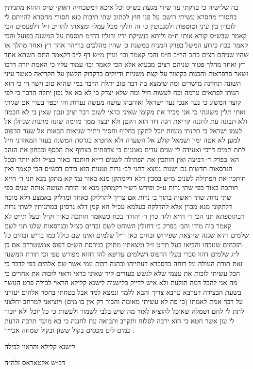 {בה שלישיה כי בדקתי עד שידי מגעת בש״ס וכל איכא דמשכחיה דאוקי ש״ס
ההוא מתניתין בחסורי מחסרא עשיתי רושם על פני חוץ לכתוב שתי תיבות
כזא חסורי מחסרא להיותם לי לזכרון בין עיני וטוטפות ולסנבוטין כי זה חלקי
מכל עמלי\hdot
ומצאתי להר״ב ז״ל דלפעמים הכי קאמר שבש״ס קורא אותו ח״מ וליתא
בנשיקת ידיו ורגליו דח״מ תוספת על המשנה בפועל והכי קאמר בכח כידוע המשל
בפרק המניח במשנת כ׳ שהיו מהלכים בר״הר אחד רץ ואחד מהלך או שהיו שניהם
רצים כתב הר״ב ח״מ והכי קאמר וכו׳ ועיין מ״ש דף ל״ב דקאמר התם השתא אחד
רץ ואחד מהלך פטור שניהם רצים מבעיא אלא הכי קאמר וכו׳ עמוד עליו כי האמת
יורה דרכו\hdot
ושאר פרפראות והבנות בקיצור על קצת משניות ודיוקים בדקדוק
הלשון על הקריאה כאשר עיני השונה תחזינה מישרים ומה שימצא בה דבר טוב יתלה
הדבר במי שהוא טוב וישר ה׳ כי הוא הנותן לפתאים ערמה וכח לעשות חיל ומה
שלא יצדק כי לא בא אל נכון יתלה הדבר בי לפי קוצר המשיג כי נער אנכי נער
ישראל ואוהבהו עושה מעשה נערות\hdot
וה׳ יכפר בעדי אם שגיתי ואתי תלין משוגתי
כי אני מכיר את מקומי שאיני כדאי לשום דבר יציב ונכון שאין בי לא חכמה ולא
תבונה עת לחננה\hdot
קריאת חנה דוד הוא הקטן ולא יבצר ממך מזימה שונה מתנות
שנחלן אל לעמו ישראל כי תקנתי מעוות יוכל לתקון בחליף וחסיר ויתיר שגיאות
הבאות אל שער הדפוס למען לא אטה ימין ושמאל קולע אל השערה ולא אחטיא
בגרסת המשנה בעזר המאזרני חיל לתת תמים דרכי ואעידה לי שנים עדים נאמנים
כי צרפתים כצרוף את הכסף וכבחון את הזהב הא׳ בפרק ד׳ דביצה ואין חותכין את
הפתילה לשנים רי״א חותכה באור כצ״ל ולא יותר ובכל הגרסאות חדשות גם ישנות
נמצא דתני לב׳ נרות וטעות הוא בידם דבש״ס הכי קאמר ואין חותכין את הפתילה
לשנים\hdot
מ״ש בסכין דלא דקמתקן מנא באור נמי קא מתקן מנא תני ר׳ חייא חותכה
באור בפי שתי נרות ע״כ\hdot
ופירש רש״י דקמתקן מנא א׳ היתה ועושה אותה שנים\hdot
בפי שתי נרות שתי ראשיה בתוך ב׳ נרות אם צריך להדליקן כאחד ומדליק באמצע
דלא מוכח דלתקוני מנא מכוין אלא להדלקה בעלמא עכ״ל הא קמן דלא גרסינן
במתניתין לשתי נרות דבתוספתא תני הכי ר׳ חייא ולזה כוין ר׳ יהודה בכח כשאמר
חותכה באור וק״ל\hdot
ובעל תי״ט לא קאמר ביה מידי\hdot
והב׳ בפרק ב׳ דחולין השוחט
לשם זבחים כצ״ל ובגרסאות שלנו תני לשם שלמים והיא שגגה שיוצאת שפירוש
זבחים כאן ר״ל שלמים ואינו שם כולל כמו בריש זבחים כל הזבחים שנזבחו והביאו
בעל תי״ט ז״ל ומצאתיו מתוקן בגירסת הש״ס דפוס אמשטרדם\hdot
אם כן ל״ג שלמים
דהוו סברי בעלי הדפוס דשלמים עדיפא להו דהוא מפורש טפי\hdot
וכי תורת המשנה
זאת תורת העולה על רוחה כדסברא דעתייהו וכהנה רבות עמי אשר שם אלהים
בפי לדבר\hdot
כי הכל עשיתי לזכות את עצמי שלא לגשש כעורים קיר שאיני כדאי
וראוי לזכות את אחרים כי מה אני להבל דמה תולעת ולא איש לדייק בלישניה לישנא
קלילא הראוי לבילה פרט הנושר בשעת הבצירה דערבא ערבא צריך והבא ללמד
ונמצא למד אבל בטחתי בחסד אלהים יעזרני על דבר אמת לאמתו (כי פה לא
עשיתי מאומה והבור רק אין בו מים) ויוציאני למרחב יחלצני לתת לי לחם ושמלה
שאוכל להוציא לאור מה שיש בלבי לשמור ולעשות כי כל יוכל\hdot
ולא יזכור לי עון
אשר חטא כי הוא ירבה לסלוח\hdot
ותקרב ותבואה עת לחננה כי בא מועד תרבה
הדעת כמים לים מכסים בקול ששון ובקול שמחה אכי״ר :

}

\vspace{1em}

\setlength{\epigraphwidth}{0.6\textwidth}
\setlength{\epigraphrule}{0pt}

\epigraph{לישנא קלילא והראוי לבילה}{{\larger[2] דב״ש אלטאראס} זלה״ה}
